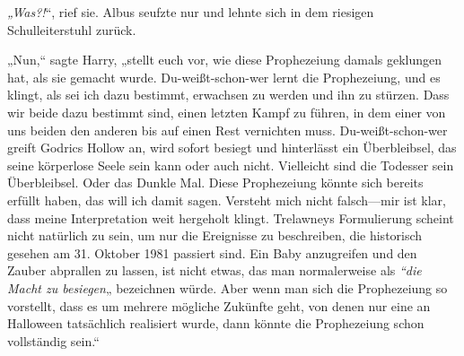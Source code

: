 \emph{„Was?!}“, rief sie. Albus seufzte nur und lehnte sich in dem riesigen Schulleiterstuhl zurück.

„Nun,“ sagte Harry, „stellt euch vor, wie diese Prophezeiung damals geklungen hat, als sie gemacht wurde. Du-weißt-schon-wer lernt die Prophezeiung, und es klingt, als sei ich dazu bestimmt, erwachsen zu werden und ihn zu stürzen. Dass wir beide dazu bestimmt sind, einen letzten Kampf zu führen, in dem einer von uns beiden den anderen bis auf einen Rest vernichten muss. Du-weißt-schon-wer greift Godrics Hollow an, wird sofort besiegt und hinterlässt ein Überbleibsel, das seine körperlose Seele sein kann oder auch nicht. Vielleicht sind die Todesser sein Überbleibsel. Oder das Dunkle Mal. Diese Prophezeiung könnte sich bereits erfüllt haben, das will ich damit sagen. Versteht mich nicht falsch—mir ist klar, dass meine Interpretation weit hergeholt klingt. Trelawneys Formulierung scheint nicht natürlich zu sein, um nur die Ereignisse zu beschreiben, die historisch gesehen am 31. Oktober 1981 passiert sind. Ein Baby anzugreifen und den Zauber abprallen zu lassen, ist nicht etwas, das man normalerweise als \emph{“die Macht zu besiegen}„ bezeichnen würde. Aber wenn man sich die Prophezeiung so vorstellt, dass es um mehrere mögliche Zukünfte geht, von denen nur eine an Halloween tatsächlich realisiert wurde, dann könnte die Prophezeiung schon vollständig sein.“

